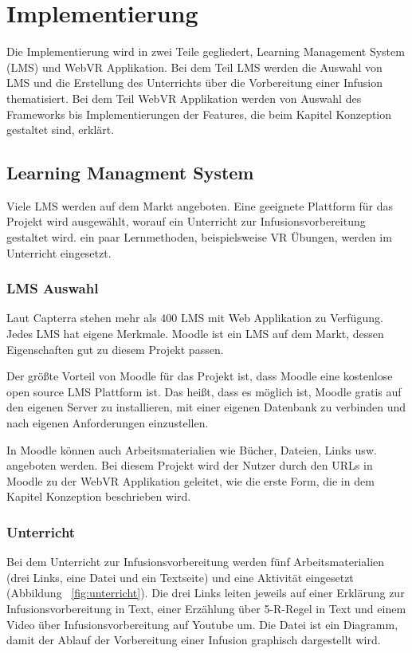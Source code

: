 \chapter{Implementierung}

Die Implementierung wird in zwei Teile gegliedert, Learning Management System (LMS) und WebVR Applikation. Bei dem Teil LMS werden die Auswahl von LMS und die Erstellung des Unterrichts über die Vorbereitung einer Infusion thematisiert. Bei dem Teil WebVR Applikation werden von Auswahl des Frameworks bis Implementierungen der Features, die beim Kapitel Konzeption gestaltet sind, erklärt.

\section{Learning Managment System}

Viele LMS werden auf dem Markt angeboten. Eine geeignete Plattform für das Projekt wird ausgewählt, worauf ein Unterricht zur Infusionsvorbereitung gestaltet wird. ein paar Lernmethoden, beispielsweise VR Übungen, werden im Unterricht eingesetzt.

 \subsection{LMS Auswahl}

 Laut Capterra stehen mehr als 400 LMS mit Web Applikation zu Verfügung. Jedes LMS hat eigene Merkmale. Moodle ist ein LMS auf dem Markt, dessen Eigenschaften gut zu diesem Projekt passen.
 
 Der größte Vorteil von Moodle für das Projekt ist, dass Moodle eine kostenlose open source LMS Plattform ist. Das heißt, dass es möglich ist, Moodle gratis auf den eigenen Server zu installieren, mit einer eigenen Datenbank zu verbinden und nach eigenen Anforderungen einzustellen.
 
 In Moodle können auch Arbeitsmaterialien wie Bücher, Dateien, Links usw. angeboten werden. Bei diesem Projekt wird der Nutzer durch den URLs in Moodle zu der WebVR Applikation geleitet, wie die erste Form, die in dem Kapitel Konzeption beschrieben wird. 
 
 \subsection{Unterricht}
 Bei dem Unterricht zur Infusionsvorbereitung werden fünf Arbeitsmaterialien (drei Links, eine Datei und ein Textseite) und eine Aktivität eingesetzt (Abbildung ~\ref{fig:unterricht}). Die drei Links leiten jeweils auf einer Erklärung zur Infusionsvorbereitung in Text, einer Erzählung über 5-R-Regel in Text und einem Video über Infusionsvorbereitung auf Youtube um. Die Datei ist ein Diagramm, damit der Ablauf der Vorbereitung einer Infusion graphisch dargestellt wird.
 
